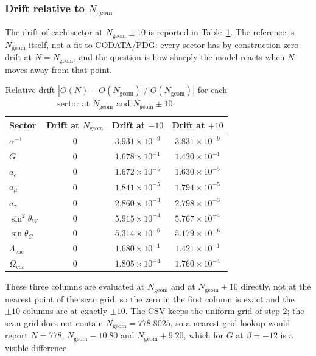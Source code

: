 \documentclass[10pt,a4paper]{article}
\begin{document}
\subsubsection{Drift relative to $N_{\text{geom}}$}

The drift of each sector at $N_{\text{geom}} \pm 10$ is reported in
Table~\ref{tab:lock_in_drift}. The reference is $N_{\text{geom}}$ itself,
not a fit to CODATA/PDG: every sector has by construction zero drift at
$N = N_{\text{geom}}$, and the question is how sharply the model reacts
when $N$ moves away from that point.

\begin{table}[h!]
	\centering
	\small
	\caption{Relative drift $|O(N) - O(N_{\text{geom}})| / |O(N_{\text{geom}})|$
		for each sector at $N_{\text{geom}}$ and $N_{\text{geom}} \pm 10$.}
	\label{tab:lock_in_drift}
	\begin{tabular}{lccc}
		\toprule
		\textbf{Sector} & \textbf{Drift at $N_{\text{geom}}$}
		& \textbf{Drift at $-10$} & \textbf{Drift at $+10$} \\
		\midrule
		$\alpha^{-1}$          & $0$ & $3.931 \times 10^{-9}$ & $3.831 \times 10^{-9}$ \\
		$G$                    & $0$ & $1.678 \times 10^{-1}$ & $1.420 \times 10^{-1}$ \\
		$a_e$                  & $0$ & $1.672 \times 10^{-5}$ & $1.630 \times 10^{-5}$ \\
		$a_\mu$                & $0$ & $1.841 \times 10^{-5}$ & $1.794 \times 10^{-5}$ \\
		$a_\tau$               & $0$ & $2.860 \times 10^{-3}$ & $2.798 \times 10^{-3}$ \\
		$\sin^2\theta_W$       & $0$ & $5.915 \times 10^{-4}$ & $5.767 \times 10^{-4}$ \\
		$\sin\theta_C$         & $0$ & $5.314 \times 10^{-6}$ & $5.179 \times 10^{-6}$ \\
		$\Lambda_{\text{vac}}$ & $0$ & $1.680 \times 10^{-1}$ & $1.421 \times 10^{-1}$ \\
		$\Omega_{\text{vac}}$  & $0$ & $1.805 \times 10^{-4}$ & $1.760 \times 10^{-4}$ \\
		\bottomrule
	\end{tabular}
\end{table}

These three columns are evaluated at $N_{\text{geom}}$ and at
$N_{\text{geom}} \pm 10$ directly, not at the nearest point of the scan
grid, so the zero in the first column is exact and the $\pm 10$ columns
are at exactly $\pm 10$. The CSV keeps the uniform grid of step 2; the
scan grid does not contain $N_{\text{geom}} = 778.8025$, so a
nearest-grid lookup would report $N = 778$, $N_{\text{geom}} - 10.80$ and
$N_{\text{geom}} + 9.20$, which for $G$ at $\beta = -12$ is a visible
difference.
\end{document}

